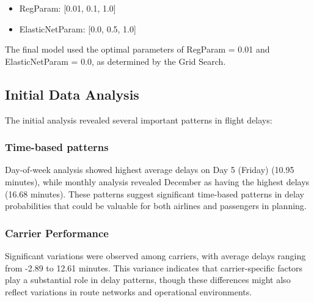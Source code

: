 \begin{itemize}
\item RegParam: [0.01, 0.1, 1.0]
\item ElasticNetParam: [0.0, 0.5, 1.0]
\end{itemize}

The final model used the optimal parameters of RegParam = 0.01 and ElasticNetParam = 0.0, as determined by the Grid Search.

\subsection{Initial Data Analysis}
The initial analysis revealed several important patterns in flight delays:

\subsubsection{Time-based patterns}
Day-of-week analysis showed highest average delays on Day 5 (Friday) (10.95 minutes), while monthly analysis revealed December as having the highest delays (16.68 minutes). These patterns suggest significant time-based patterns in delay probabilities that could be valuable for both airlines and passengers in planning.

\subsubsection{Carrier Performance}
Significant variations were observed among carriers, with average delays ranging from -2.89 to 12.61 minutes. This variance indicates that carrier-specific factors play a substantial role in delay patterns, though these differences might also reflect variations in route networks and operational environments.
